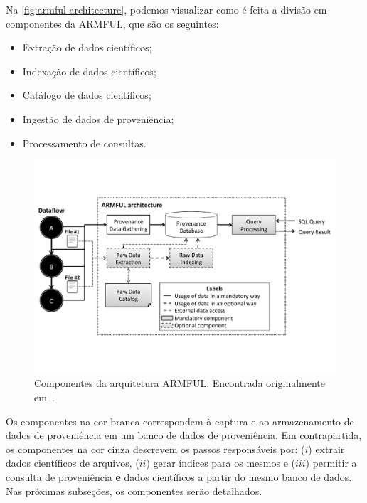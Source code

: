 
Na \autoref{fig:armful-architecture}, podemos visualizar como é feita a divisão em componentes da ARMFUL, que são os seguintes:

\begin{itemize}
    \item Extração de dados científicos;
    \item Indexação de dados científicos;
    \item Catálogo de dados científicos;
    \item Ingestão de dados de proveniência;
    \item Processamento de consultas.
\end{itemize}

\begin{figure}[ht]
    \centering
    \includegraphics[width=\textwidth]{img/armful-architecture}
    \caption[Componentes da arquitetura ARMFUL]{Componentes da arquitetura ARMFUL. Encontrada originalmente em~\cite{silva2017raw}.}%
    \label{fig:armful-architecture}
\end{figure}

Os componentes na cor branca correspondem à captura e ao armazenamento de dados de proveniência em um banco de dados de proveniência. Em contrapartida, os componentes na cor cinza descrevem os passos responsáveis por: (\(i\)) extrair dados científicos de arquivos, (\(ii\)) gerar índices para os mesmos e (\(iii\)) permitir a consulta de proveniência \textbf{e} dados científicos a partir do mesmo banco de dados. Nas próximas subseções, os componentes serão detalhados.

